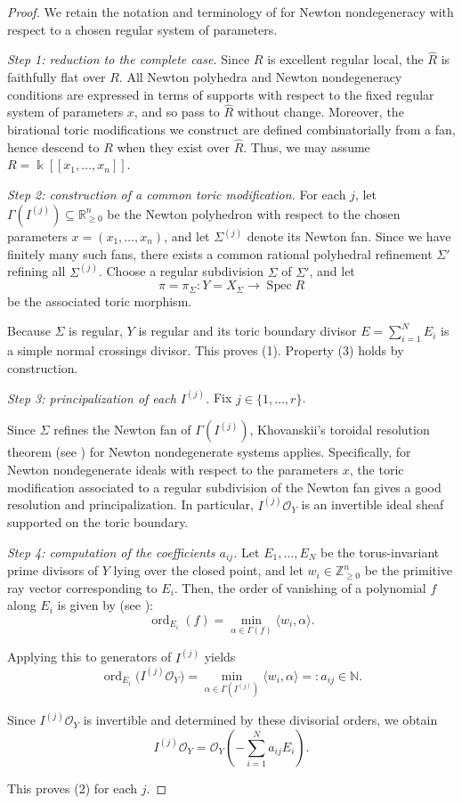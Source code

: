 \documentclass[12pt]{amsart}
\newcommand{\NN}{\mathbb{N}}
\newcommand{\ZZ}{\mathbb{Z}}
\newcommand{\RR}{\mathbb{R}}
\newcommand{\ord}{\operatorname{\mathrm{ord}}}
\newcommand{\cO}{\mathcal{O}}
\DeclareMathOperator{\Spec}{Spec}
\theoremstyle{plain}
\theoremstyle{definition}
\numberwithin{equation}{section}
\begin{document}
\begin{proof} We retain the notation and terminology of \cite{HNP25} for Newton nondegeneracy with respect to a chosen regular system of parameters.
	
	\medskip
	\noindent
	\emph{Step 1: reduction to the complete case.}
	Since $R$ is excellent regular local, the $\widehat R$ is faithfully flat over $R$. All Newton polyhedra and Newton nondegeneracy conditions are expressed in terms of supports with respect to the fixed regular system of parameters $x$, and so pass to $\widehat{R}$ without change. Moreover, the birational toric modifications we construct are defined combinatorially from a fan, hence descend to $R$ when they exist over $\widehat{R}$.
	Thus, we may assume $R=\Bbbk[[x_1,\dots,x_n]]$.
	
	\medskip
	\noindent
	\emph{Step 2: construction of a common toric modification.}
	For each $j$, let $\Gamma(I^{(j)})\subseteq \RR_{\ge0}^n$ be the Newton polyhedron
	with respect to the chosen parameters $x=(x_1,\dots,x_n)$,
	and let $\Sigma^{(j)}$ denote its Newton fan.
	Since we have finitely many such fans,
	there exists a common rational polyhedral refinement $\Sigma'$
	refining all $\Sigma^{(j)}$.
	Choose a regular subdivision $\Sigma$ of $\Sigma'$, and let
	\[
	\pi=\pi_\Sigma:Y=X_\Sigma\longrightarrow \Spec R
	\]
	be the associated toric morphism.
	
	Because $\Sigma$ is regular,
	$Y$ is regular and its toric boundary divisor $E=\sum_{i=1}^N E_i$
	is a simple normal crossings divisor.
	This proves (1).
	Property (3) holds by construction.
	
	\medskip
	\noindent
	\emph{Step 3: principalization of each $I^{(j)}$.}
	Fix $j\in\{1,\dots,r\}$.
	
	Since $\Sigma$ refines the Newton fan of $\Gamma(I^{(j)})$,
	Khovanskii’s toroidal resolution theorem (see \cite{Khovanskii,Oka}) for Newton nondegenerate systems applies.
	Specifically, for Newton nondegenerate ideals with respect to the parameters $x$,
	the toric modification associated to a regular subdivision of the Newton fan
	gives a good resolution and principalization.
	In particular, $I^{(j)}\cO_Y$
	is an invertible ideal sheaf supported on the toric boundary.
	
	\medskip
	\noindent
	\emph{Step 4: computation of the coefficients $a_{ij}$.}
	Let $E_1,\dots,E_N$ be the torus-invariant prime divisors of $Y$
	lying over the closed point,
	and let $w_i\in\ZZ_{\ge0}^n$ be the primitive ray vector corresponding to $E_i$.
	Then, the order of vanishing of a polynomial $f$ along $E_i$ is given by (see \cite{Khovanskii,Oka}):
	\[
	\ord_{E_i}(f)
	=
	\min_{\alpha\in\Gamma(f)}\langle w_i,\alpha\rangle.
	\]
	
	Applying this to generators of $I^{(j)}$ yields
	\[
	\ord_{E_i}\bigl(I^{(j)}\cO_Y\bigr)
	=
	\min_{\alpha\in\Gamma(I^{(j)})}\langle w_i,\alpha\rangle
	=: a_{ij}\in\NN.
	\]
	
	Since $I^{(j)}\cO_Y$ is invertible and determined by these divisorial orders,
	we obtain
	\[
	I^{(j)}\cO_Y=\cO_Y\!\left(-\sum_{i=1}^N a_{ij}E_i\right).
	\]
	
	This proves (2) for each $j$.
\end{proof}
\end{document}
